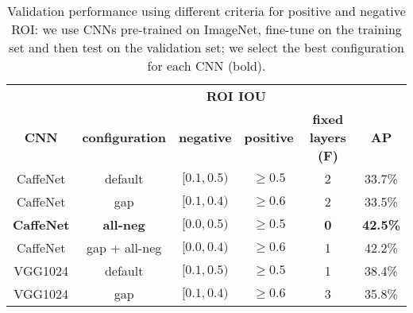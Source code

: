 \documentclass[runningheads]{llncs}
\begin{document}
\begin{table}[b!]
\begin{center}
\caption{Validation performance using different criteria for positive and negative \ac{ROI}: we use CNNs pre-trained on ImageNet, fine-tune on the training set and then test on the validation set; we select the best configuration for each \ac{CNN} (bold). \label{tbl:ROISelection}}
\begin{tabular}{cccccc}
  \hline
  & & \multicolumn{2}{c}{\textbf{\ac{ROI} \ac{IOU}}} \\
  \cline{3-4}
  \textbf{CNN} & \textbf{configuration} & \textbf{negative} & \textbf{positive} &
  \textbf{fixed layers (F)} & \textbf{AP} \\
 \hline
  CaffeNet & default &\begin{math} {[{0.1},{0.5})} \end{math} & \begin{math}\geq 0.5 \end{math} & 2 & 33.7\% \\
  CaffeNet & gap &\begin{math} {[{0.1},{0.4})} \end{math} & \begin{math}\geq 0.6 \end{math} & 2 & 33.5\% \\
\textbf{  CaffeNet } & \textbf{ all-neg } & \begin{math}\mathbf{ {[{0.0},{0.5})} }\end{math}  &  \begin{math}\mathbf{\geq 0.5 }\end{math}  & \textbf{ 0 } & \textbf{ 42.5\%} \\
  CaffeNet & gap + all-neg &\begin{math} {[{0.0},{0.4})} \end{math} & \begin{math}\geq 0.6 \end{math} & 1 & 42.2\% \\
\hline
  VGG1024 & default &\begin{math} {[{0.1},{0.5})} \end{math} & \begin{math}\geq 0.5 \end{math} & 1 & 38.4\% \\
  VGG1024 & gap &\begin{math} {[{0.1},{0.4})} \end{math} & \begin{math}\geq 0.6 \end{math} & 3 & 35.8\% \\

\end{tabular}
\end{center}
\end{table}
\end{document}
